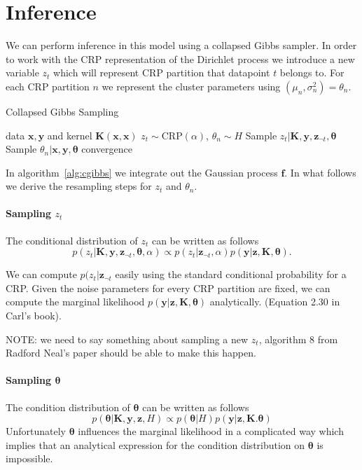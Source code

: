 \documentclass{article}
\begin{document}
\section{Inference}
\label{inference}

We can perform inference in this model using a collapsed Gibbs sampler. In order to work with the CRP representation of the Dirichlet process we introduce a new variable $z_t$ which will represent CRP partition that datapoint $t$ belongs to. For each CRP partition $n$ we represent the cluster parameters using $(\mu_n, \sigma^2_n) = \theta_n$.

\begin{algorithm}[tb]
   \caption{Collapsed Gibbs Sampling}
   \label{alg:cgibbs}
\begin{algorithmic}
    data $\bm{x}, \bm{y}$ and kernel $\bm{K}(\bm{x},\bm{x})$
    $z_t \sim \textrm{CRP}(\alpha)$, $\theta_n \sim H$
   \REPEAT
   \STATE Sample $z_t | \bm{K}, \bm{y}, \bm{z}_{\lnot t}, \bm{\theta}$
   \STATE Sample $\theta_n | \bm{x}, \bm{y}, \bm{\theta}$
   \UNTIL convergence
\end{algorithmic}
\end{algorithm}

In algorithm~\ref{alg:cgibbs} we integrate out the Gaussian process $\bm{f}$. In what follows we derive the resampling steps for $z_t$ and $\theta_n$.

\paragraph{Sampling $z_t$} The conditional distribution of $z_t$ can be written as follows
\begin{equation}
p(z_t | \bm{K}, \bm{y}, \bm{z}_{\lnot t}, \bm{\theta}, \alpha) \propto p(z_t | \bm{z}_{\lnot t}, \alpha) p(\bm{y} | \bm{z}, \bm{K}, \bm{\theta}).
\end{equation}

We can compute $p(z_t | \bm{z}_{\lnot t}$ easily using the standard conditional probability for a CRP. Given the noise parameters for every CRP partition are fixed, we can compute the marginal likelihood $p(\bm{y} | \bm{z}, \bm{K}, \bm{\theta})$ analytically. (Equation 2.30 in Carl's book).

NOTE: we need to say something about sampling a new $z_t$, algorithm 8 from Radford Neal's paper should be able to make this happen.


\paragraph{Sampling $\bm{\theta}$}
The condition distribution of $\bm{\theta}$ can be written as follows
\begin{equation}
p(\bm{\theta} | \bm{K}, \bm{y}, \bm{z}, H) \propto p(\bm{\theta} | H) p(\bm{y} | \bm{z}, \bm{K}. \bm{\theta})
\end{equation}
Unfortunately $\bm{\theta}$ influences the marginal likelihood in a complicated way which implies that an analytical expression for the condition distribution on $\bm{\theta}$ is impossible.
\end{document}
